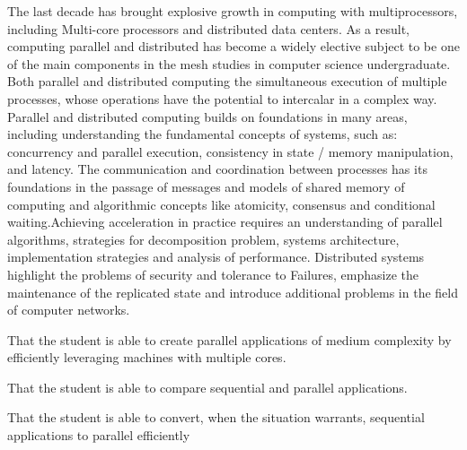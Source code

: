 \begin{syllabus}


\begin{justification}
The last decade has brought explosive growth in computing with multiprocessors, including
Multi-core processors and distributed data centers. As a result, computing parallel and distributed has become a widely elective subject to be one of the main components
in the mesh studies in computer science undergraduate. Both parallel and distributed computing the simultaneous execution of multiple processes, whose operations have the potential to
intercalar in a complex way. Parallel and distributed computing builds on foundations in many areas, including understanding the fundamental concepts of systems, such as: concurrency
and parallel execution, consistency in state / memory manipulation, and latency. The communication and coordination between processes has its foundations in the passage of messages and models of
shared memory of computing and algorithmic concepts like atomicity, consensus and conditional waiting.Achieving acceleration in practice requires an understanding of parallel algorithms, strategies for
decomposition problem, systems architecture, implementation strategies and analysis of performance. Distributed systems highlight the problems of security and tolerance to
Failures, emphasize the maintenance of the replicated state and introduce additional problems in the field of computer networks.
\end{justification}

\begin{goals}
\item That the student is able to create parallel applications of medium complexity by efficiently leveraging machines with multiple cores.
\item That the student is able to compare sequential and parallel applications.
\item That the student is able to convert, when the situation warrants, sequential applications to parallel efficiently
\end{goals}

\begin{outcomes}
    \item {} 
    \item {} %
    \item {} %
    \item {} %
\end{outcomes}


\end{syllabus}
